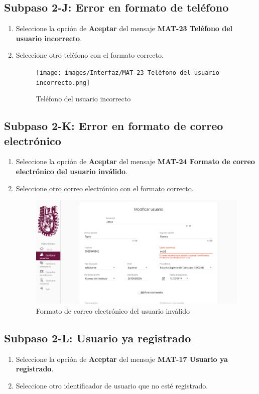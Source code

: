\subsection{Subpaso 2-J: Error en formato de teléfono}
\begin{enumerate}
	\item Seleccione la opción de \textbf{Aceptar} del mensaje
\textbf{MAT-23 Teléfono del usuario incorrecto}.
	\item Seleccione otro teléfono con el formato correcto.
	\begin{figure}[hbtp]
	\texttt{[image: images/Interfaz/MAT-23 Teléfono del usuario incorrecto.png]}
	\caption{Teléfono del usuario incorrecto}
	\end{figure}
\end{enumerate}

\subsection{Subpaso 2-K: Error en formato de correo electrónico}
\begin{enumerate}
	\item Seleccione la opción de \textbf{Aceptar} del mensaje
\textbf{MAT-24 Formato de correo electrónico del usuario inválido}.
	\item Seleccione otro correo electrónico con el formato correcto.
	\begin{figure}[hbtp]
	\includegraphics[scale=0.3]{images/Interfaz/MAT-24 Formato de correo electrónico del usuario inválido.png}
	\caption{Formato de correo electrónico del usuario inválido}
	\end{figure}
\end{enumerate}

\subsection{Subpaso 2-L: Usuario ya registrado}
\begin{enumerate}
	\item Seleccione la opción de \textbf{Aceptar} del mensaje
\textbf{MAT-17 Usuario ya registrado}.
	\item Seleccione otro identificador de usuario que no esté registrado.
\end{enumerate}

